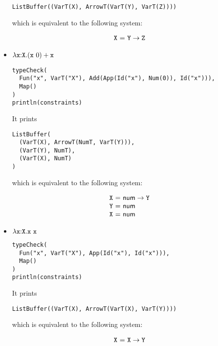 \begin{itemize}
\begin{verbatim}
ListBuffer((VarT(X), ArrowT(VarT(Y), VarT(Z))))
\end{verbatim}

which is equivalent to the following system:

\[
\begin{array}{r@{~}c@{~}l}
  \cX &=& \tarrow{\cY}{\cZ} \\
\end{array}
\]

\item $\lambda\texttt{x}{:}\texttt{X}.(\texttt{x}\ 0)+\texttt{x}$

\begin{verbatim}
typeCheck(
  Fun("x", VarT("X"), Add(App(Id("x"), Num(0)), Id("x"))),
  Map()
)
println(constraints)
\end{verbatim}

It prints

\begin{verbatim}
ListBuffer(
  (VarT(X), ArrowT(NumT, VarT(Y))),
  (VarT(Y), NumT),
  (VarT(X), NumT)
)
\end{verbatim}

which is equivalent to the following system:

\[
\begin{array}{r@{~}c@{~}l}
  \cX &=& \tarrow{\tnum}{\cY} \\
  \cY &=& \tnum \\
  \cX &=& \tnum \\
\end{array}
\]

\item $\lambda\texttt{x}{:}\texttt{X}.\texttt{x}\ \texttt{x}$

\begin{verbatim}
typeCheck(
  Fun("x", VarT("X"), App(Id("x"), Id("x"))),
  Map()
)
println(constraints)
\end{verbatim}

It prints

\begin{verbatim}
ListBuffer((VarT(X), ArrowT(VarT(X), VarT(Y))))
\end{verbatim}

which is equivalent to the following system:

\[
\begin{array}{r@{~}c@{~}l}
  \cX &=& \tarrow{\cX}{\cY} \\
\end{array}
\]
\end{itemize}


